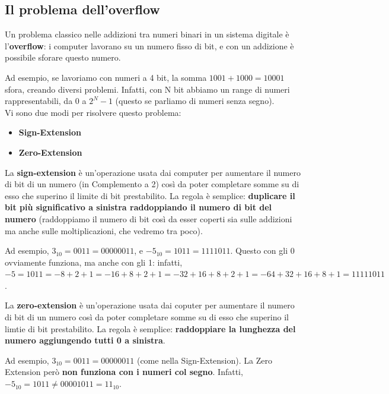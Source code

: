 \documentclass[11pt, a4paper, titlepage, oneside]{scrbook}
\begin{document}
\subsection{Il problema dell'overflow}

\begin{Osservazione}[Overflow]
\label{oss-overflow}
Un problema classico nelle addizioni tra numeri binari in un sistema digitale è l'\textbf{overflow}: i computer lavorano su un numero fisso di bit, e con un addizione è possibile sforare questo numero. 
\end{Osservazione}

Ad esempio, se lavoriamo con numeri a 4 bit, la somma $1001 + 1000 = 10001$ sfora, creando diversi problemi. Infatti, con N bit abbiamo un range di numeri rappresentabili, da $0$ a $2^N-1$ (questo se parliamo di numeri senza segno).\\
Vi sono due modi per risolvere questo problema:
\begin{itemize}
    \item \textbf{Sign-Extension}
    \item \textbf{Zero-Extension}
\end{itemize}

\begin{Proprieta}
\label{prop-sign-extention}
La \textbf{sign-extension} è un'operazione usata dai computer per aumentare il numero di bit di un numero (in Complemento a 2) così da poter completare somme su di esso che superino il limite di bit prestabilito. La regola è semplice: \textbf{duplicare il bit più significativo a sinistra raddoppiando il numero di bit del numero} (raddoppiamo il numero di bit così da esser coperti sia sulle addizioni ma anche sulle moltiplicazioni, che vedremo tra poco).
\end{Proprieta}

Ad esempio, $3_{10} = 0011 = 00000011$, e $-5_{10} = 1011 = 1111011$. Questo con gli 0 ovviamente funziona, ma anche con gli 1: infatti, $-5 = 1011 = -8 + 2 + 1 = - 16 + 8 + 2 + 1 = -32 + 16 + 8 + 2 +1 = -64 + 32 + 16 + 8 +1 = 11111011$. 

\begin{Proprieta}
\label{zero-extension}
La \textbf{zero-extension} è un'operazione usata dai coputer per aumentare il numero di bit di un numero così da poter completare somme su di esso che superino il limtie di bit prestabilito. La regola è semplice: \textbf{raddoppiare la lunghezza del numero aggiungendo tutti 0 a sinistra}.
\end{Proprieta}
Ad esempio, $3_{10} = 0011 = 00000011$ (come nella Sign-Extension). La Zero Extension però \textbf{non funziona con i numeri col segno}. Infatti, $-5_{10} = 1011 \neq 00001011 = 11_{10}$. 
\end{document}
